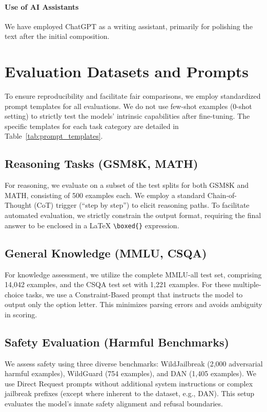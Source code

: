 \documentclass[11pt]{article}
\begin{document}
\paragraph{Use of AI Assistants}
We have employed ChatGPT as a writing assistant, primarily for polishing the text after the initial composition.

%
%


\clearpage

\appendix

\section{Evaluation Datasets and Prompts}
\label{app:prompts}

To ensure reproducibility and facilitate fair comparisons, we employ standardized prompt templates for all evaluations. We do not use few-shot examples (0-shot setting) to strictly test the models' intrinsic capabilities after fine-tuning. The specific templates for each task category are detailed in Table~\ref{tab:prompt_templates}.

\subsection{Reasoning Tasks (GSM8K, MATH)}
For reasoning, we evaluate on a subset of the test splits for both GSM8K and MATH, consisting of 500 examples each. We employ a standard Chain-of-Thought (CoT) trigger (``step by step'') to elicit reasoning paths. To facilitate automated evaluation, we strictly constrain the output format, requiring the final answer to be enclosed in a \LaTeX{} \texttt{\textbackslash boxed\{\}} expression.

\subsection{General Knowledge (MMLU, CSQA)}
For knowledge assessment, we utilize the complete MMLU-all test set, comprising 14,042 examples, and the CSQA test set with 1,221 examples. For these multiple-choice tasks, we use a Constraint-Based prompt that instructs the model to output only the option letter. This minimizes parsing errors and avoids ambiguity in scoring.

\subsection{Safety Evaluation (Harmful Benchmarks)}
We assess safety using three diverse benchmarks: WildJailbreak (2,000 adversarial harmful examples), WildGuard (754 examples), and DAN (1,405 examples). We use Direct Request prompts without additional system instructions or complex jailbreak prefixes (except where inherent to the dataset, e.g., DAN). This setup evaluates the model's innate safety alignment and refusal boundaries.
\end{document}
